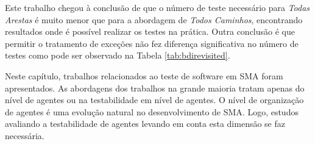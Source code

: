 Este trabalho chegou à conclusão de que o número de teste necessário para \textit{Todas Arestas} é muito menor que para a abordagem de \textit{Todos Caminhos}, encontrando resultados onde é possível realizar os testes na prática. Outra conclusão é que permitir o tratamento de exceções não fez diferença significativa no número de testes como pode ser observado na Tabela \ref{tab:bdirevisited}.

Neste capítulo, trabalhos relacionados ao teste de software em SMA foram apresentados. As abordagens dos trabalhos na grande maioria tratam apenas do nível de agentes ou na testabilidade em nível de agentes. O nível de organização de agentes é uma evolução natural no desenvolvimento de SMA. Logo, estudos avaliando a testabilidade de agentes levando em conta esta dimensão se faz necessária.

